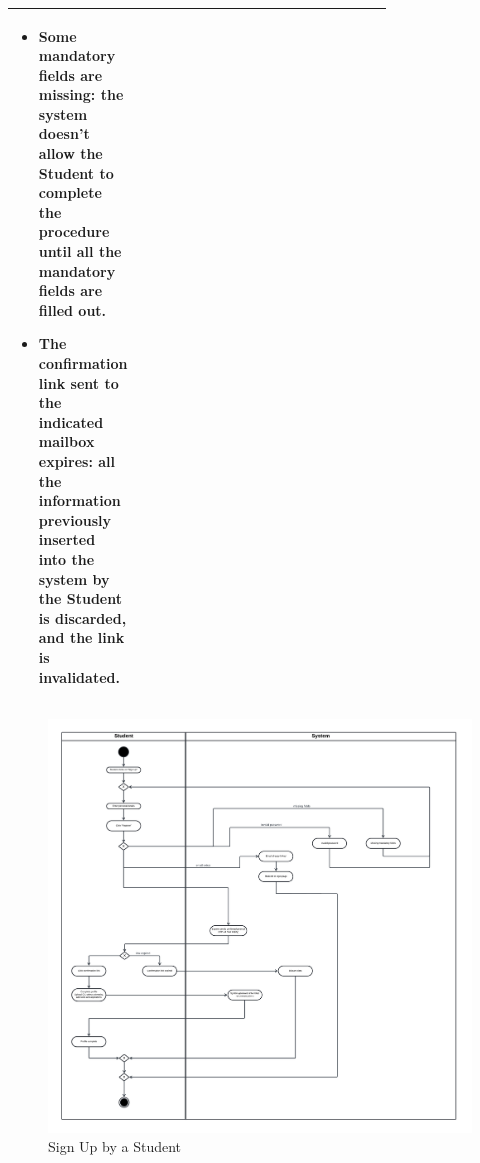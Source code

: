 \begin{center}
\begin{longtable}{|l|p{0.75\linewidth}|}
\begin{itemize}
            \item Some mandatory fields are missing: the system doesn't allow the Student to complete the procedure until all the mandatory fields are filled out.
            \item The confirmation link sent to the indicated mailbox expires: all the information previously inserted into the system by the Student is discarded, and the link is invalidated.
        \end{itemize} \\
        \hline
    \end{longtable}
\end{center}

\begin{figure}[H]
    \begin{center}
         \includegraphics[width=1\linewidth]{LaTeXCode/images/activity diagram/UC1.png}
         \caption{Sign Up by a Student}
         \label{fig:signup_student_ad}
     \end{center}
\end{figure}

\newpage

